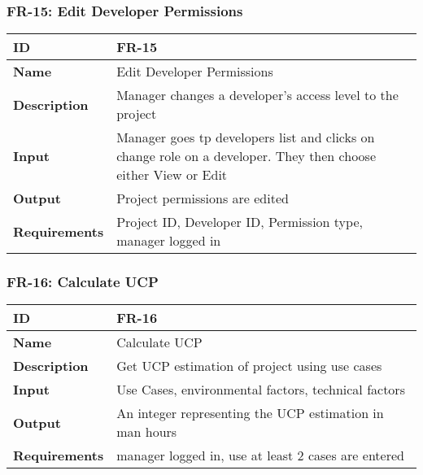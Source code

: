    

    \subsubsection{FR-15: Edit Developer Permissions}
    \begin{center}
        \begin{tabularx}{\textwidth}{|l|X|}
            \hline
            \textbf{ID} & FR-15 \\
            \hline
            \textbf{Name} & Edit Developer Permissions \\
            \hline
            \textbf{Description} & Manager changes a developer's access level to the project \\
            \hline
            \textbf{Input} & Manager goes tp developers list and clicks on change role on a developer. They then choose either View or Edit \\
            \hline
            \textbf{Output} & Project permissions are edited \\
            \hline
            \textbf{Requirements} & Project ID, Developer ID, Permission type, manager logged in \\
            \hline
        \end{tabularx}
    \end{center}
    
    

    \subsubsection{FR-16: Calculate UCP}
    \begin{center}
        \begin{tabularx}{\textwidth}{|l|X|}
            \hline
            \textbf{ID} & FR-16 \\
            \hline
            \textbf{Name} & Calculate UCP \\
            \hline
            \textbf{Description} & Get UCP estimation of project using use cases \\
            \hline
            \textbf{Input} & Use Cases, environmental factors, technical factors \\
            \hline
            \textbf{Output} & An integer representing the UCP estimation in man hours \\
            \hline
            \textbf{Requirements} & manager logged in, use at least 2 cases are entered \\
            \hline
        \end{tabularx}
    \end{center}
    \newpage
    

